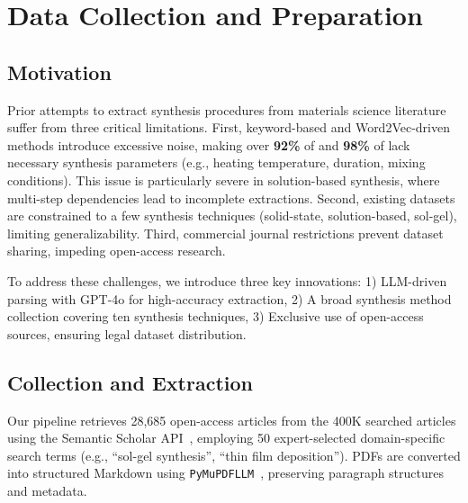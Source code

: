 \section{Data Collection and Preparation}
\label{sec:data_collection}

\subsection{Motivation}
\label{subsec:motivation}

Prior attempts to extract synthesis procedures from materials science literature~\cite{kononova2019text,wang2022dataset} suffer from three critical limitations. First, keyword-based and Word2Vec-driven~\cite{mikolov2013efficient} methods introduce excessive noise, making over \textbf{92\%} of \citeauthor{kononova2019text} and \textbf{98\%} of \citeauthor{wang2022dataset} lack necessary synthesis parameters (e.g., heating temperature, duration, mixing conditions). This issue is particularly severe in solution-based synthesis, where multi-step dependencies lead to incomplete extractions. Second, existing datasets are constrained to a few synthesis techniques (solid-state, solution-based, sol-gel), limiting generalizability. Third, commercial journal restrictions prevent dataset sharing, impeding open-access research.

To address these challenges, we introduce three key innovations:  
1) LLM-driven parsing with GPT-4o for high-accuracy extraction,  
2) A broad synthesis method collection covering ten synthesis techniques,  
3) Exclusive use of open-access sources, ensuring legal dataset distribution.  

\subsection{Collection and Extraction}
\label{subsec:collection_extraction}

Our pipeline retrieves 28,685 open-access articles from the 400K searched articles using the Semantic Scholar API~\cite{semanticscholar2023}, employing 50 expert-selected domain-specific search terms (e.g., “sol-gel synthesis”, “thin film deposition”). PDFs are converted into structured Markdown using \texttt{PyMuPDFLLM}~\cite{pymupdf4llm2024}, preserving paragraph structures and metadata.

